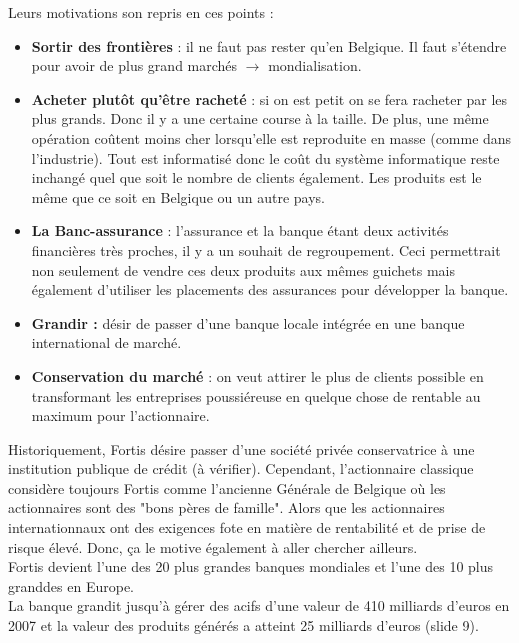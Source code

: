 Leurs motivations son repris en ces points : 
\begin{itemize}
\item \textbf{Sortir des frontières} : il ne faut pas rester qu'en Belgique. Il faut s'étendre pour avoir de plus grand marchés $\rightarrow$ mondialisation.

\item \textbf{Acheter plutôt qu'être racheté} : si on est petit on se fera racheter par les plus grands. Donc il y a une certaine course à la taille. De plus, une même opération coûtent moins cher lorsqu'elle est reproduite en masse (comme dans l'industrie). Tout est informatisé donc le coût du système informatique reste inchangé quel que soit le nombre de clients également. Les produits est le même que ce soit en Belgique ou un autre pays. 

\item \textbf{La Banc-assurance} : l'assurance et la banque étant deux activités financières très proches, il y a un souhait de regroupement. Ceci permettrait non seulement de vendre ces deux produits aux mêmes guichets mais également d'utiliser les placements des assurances pour développer la banque.

\item \textbf{Grandir :} désir de passer d'une banque locale intégrée en une  banque international de marché. 

\item \textbf{Conservation du marché} : on veut attirer le plus de clients possible en transformant les entreprises poussiéreuse en quelque chose de rentable au maximum pour l'actionnaire.
\end{itemize}

Historiquement, Fortis désire passer d'une société privée conservatrice à une institution publique de crédit (à vérifier). Cependant, l'actionnaire classique considère toujours Fortis comme l'ancienne Générale de Belgique où les actionnaires sont des "bons pères de famille". Alors que les actionnaires internationnaux ont des exigences fote en matière de rentabilité et de prise de risque élevé. Donc, ça le motive également à aller chercher ailleurs. \\
Fortis devient l'une des 20 plus grandes banques mondiales et l'une des 10 plus granddes en Europe. \\
La banque grandit jusqu'à gérer des acifs d'une valeur de 410 milliards d'euros en 2007 et la valeur des produits générés a atteint 25 milliards d'euros (slide 9). 

